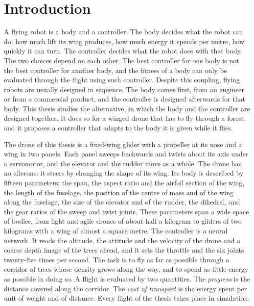 \chapter{Introduction}
\label{ch:introduction}

A flying robot is a body and a controller. The body decides what the robot can do: how much lift its wing produces, how much energy it spends per metre, how quickly it can turn. The controller decides what the robot does with that body. The two choices depend on each other. The best controller for one body is not the best controller for another body, and the fitness of a body can only be evaluated through the flight using such controller. Despite this coupling, flying robots are usually designed in sequence. The body comes first, from an engineer or from a commercial product, and the controller is designed afterwards for that body. This thesis studies the alternative, in which the body and the controller are designed together. It does so for a winged drone that has to fly through a forest, and it proposes a controller that adapts to the body it is given while it flies.

The drone of this thesis is a fixed-wing glider with a propeller at its nose and a wing in two panels. Each panel sweeps backwards and twists about its axis under a servomotor, and the elevator and the rudder move as a whole. The drone has no ailerons: it steers by changing the shape of its wing. Its body is described by fifteen parameters: the span, the aspect ratio and the airfoil section of the wing, the length of the fuselage, the position of the centre of mass and of the wing along the fuselage, the size of the elevator and of the rudder, the dihedral, and the gear ratios of the sweep and twist joints. These parameters span a wide space of bodies, from light and agile drones of about half a kilogram to gliders of two kilograms with a wing of almost a square metre. The controller is a neural network. It reads the altitude, the attitude and the velocity of the drone and a coarse depth image of the trees ahead, and it sets the throttle and the six joints twenty-five times per second. The task is to fly as far as possible through a corridor of trees whose density grows along the way, and to spend as little energy as possible in doing so. A flight is evaluated by two quantities. The \emph{progress} is the distance covered along the corridor. The \emph{cost of transport} is the energy spent per unit of weight and of distance. Every flight of the thesis takes place in simulation.


